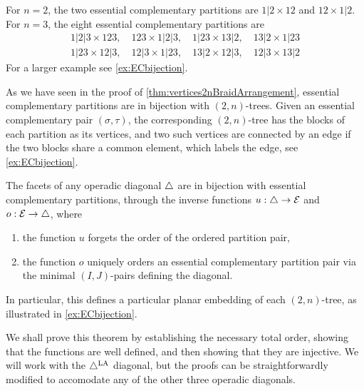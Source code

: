 \begin{example}
For $n=2$, the two essential complementary partitions are $1|2 \times 12$ and $12 \times 1|2$. For $n=3$, the eight essential complementary partitions are
\begin{align*}
	1|2|3 \times 123,\quad 
	123 \times 1|2|3,\quad 
	1|23 \times 13|2,\quad 
	13|2 \times 1|23\\
	1|23 \times 12|3,\quad 
	12|3 \times 1|23,\quad 
	13|2 \times 12|3,\quad 
	12|3 \times 13|2
\end{align*}
For a larger example see \cref{ex:ECbijection}. 
\end{example}


As we have seen in the proof of \cref{thm:vertices2nBraidArrangement}, essential complementary partitions are in bijection with $(2,n)$-trees.
Given an essential complementary pair $(\sigma,\tau)$, the corresponding $(2,n)$-tree has the blocks of each partition as its vertices, and two such vertices are connected by an edge if the two blocks share a common element, which labels the edge, see \cref{ex:ECbijection}.


\begin{theorem}
\label{thm:facets}
The facets of any operadic diagonal $\triangle$ are in bijection with essential complementary partitions, through the inverse functions $u:\triangle \to \mathcal{E}$ and $o:\mathcal{E}\to \triangle$, where
\begin{enumerate}
    \item the function $u$ forgets the order of the ordered partition pair,
    \item the function $o$ uniquely orders an essential complementary partition pair via the minimal $(I,J)$-pairs defining the diagonal. 
\end{enumerate}
In particular, this defines a particular planar embedding of each $(2,n)$-tree, as illustrated in \cref{ex:ECbijection}.
\end{theorem}

We shall prove this theorem by establishing the necessary total order, showing that the functions are well defined, and then showing that they are injective.
We will work with the $\triangle^{\mathrm{LA}}$ diagonal, but the proofs can be straightforwardly modified to accomodate any of the other three operadic diagonals. 

